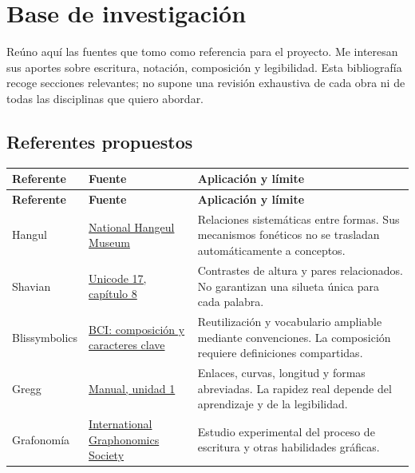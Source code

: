 \section{Base de investigación}

Reúno aquí las fuentes que tomo como referencia para el proyecto. Me interesan
sus aportes sobre escritura, notación, composición y legibilidad. Esta bibliografía
recoge secciones relevantes; no supone una revisión exhaustiva de cada obra ni
de todas las disciplinas que quiero abordar.

\subsection{Referentes propuestos}

\begingroup\small
\begin{longtable}{@{}>{\raggedright\arraybackslash}p{}>{\raggedright\arraybackslash}p{}>{\raggedright\arraybackslash}p{}@{}}
\toprule
\textbf{Referente} & \textbf{Fuente} & \textbf{Aplicación y límite} \\ \midrule
\endfirsthead
\toprule
\textbf{Referente} & \textbf{Fuente} & \textbf{Aplicación y límite} \\ \midrule
\endhead
\bottomrule\endfoot
Hangul & \href{https://www.hangeul.go.kr/en/exhi/dailyExhibition.do}{National Hangeul Museum} & Relaciones sistemáticas entre formas. Sus mecanismos fonéticos no se trasladan automáticamente a conceptos. \\[4pt]
Shavian & \href{https://www.unicode.org/versions/Unicode17.0.0/core-spec/chapter-8/}{Unicode 17, capítulo 8} & Contrastes de altura y pares relacionados. No garantizan una silueta única para cada palabra. \\[4pt]
Blissymbolics & \href{https://www.blissymbolics.org/index.php/component/content/article?Itemid=0\&id=10}{BCI: composición y caracteres clave} & Reutilización y vocabulario ampliable mediante convenciones. La composición requiere definiciones compartidas. \\[4pt]
Gregg & \href{https://greggshorthand.github.io/anunit01.html}{Manual, unidad 1} & Enlaces, curvas, longitud y formas abreviadas. La rapidez real depende del aprendizaje y de la legibilidad. \\[4pt]
Grafonomía & \href{https://graphonomics.net/}{International Graphonomics Society} & Estudio experimental del proceso de escritura y otras habilidades gráficas. \\[4pt]

\end{longtable}

